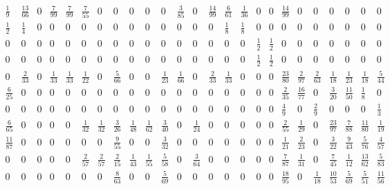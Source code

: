 \documentclass[11pt]{report}
\begin{document}
\begin{appendices}
\begin{figure} [H]
\begin{equation*}
\begin{array}{ccccccccccccccccccccccccc}
\frac{1}{9}&\frac{13}{66}&0&\frac{7}{99}&\frac{7}{99}&\frac{7}{55}&0&0&0&0&0&\frac{3}{85}&0&\frac{14}{99}&\frac{6}{61}&\frac{1}{36}&0&0&\frac{14}{99}&0&0&0&0&0&0\\

\frac{1}{2}&\frac{1}{4}&0&0&0&0&0&0&0&0&0&0&0&0&\frac{1}{8}&\frac{1}{8}&0&0&0&0&0&0&0&0&0\\

0&0&0&0&0&0&0&0&0&0&0&0&0&0&0&0&\frac{1}{2}&\frac{1}{2}&0&0&0&0&0&0&0\\

0&0&0&0&0&0&0&0&0&0&0&0&0&0&0&0&\frac{1}{2}&\frac{1}{2}&0&0&0&0&0&0&0\\

0&\frac{2}{33}&0&\frac{1}{33}&\frac{1}{33}&\frac{1}{22}&0&\frac{5}{66}&0&0&\frac{1}{23}&\frac{1}{66}&0&\frac{2}{33}&\frac{1}{33}&0&0&0&\frac{23}{80}&\frac{2}{97}&\frac{2}{63}&\frac{1}{18}&\frac{1}{23}&\frac{1}{18}&\frac{5}{44}\\

\frac{6}{25}&0&0&0&0&0&0&0&0&0&0&0&0&0&0&0&0&0&\frac{2}{35}&\frac{16}{77}&0&\frac{3}{20}&\frac{11}{50}&\frac{1}{8}&0\\

0&0&0&0&0&0&0&0&0&0&0&0&0&0&0&0&0&0&\frac{4}{9}&0&\frac{2}{9}&0&0&0&\frac{1}{3}\\

\frac{6}{65}&0&0&0&0&\frac{1}{32}&\frac{1}{32}&\frac{3}{26}&\frac{1}{48}&\frac{1}{62}&\frac{3}{40}&0&\frac{1}{24}&0&0&0&0&0&\frac{2}{55}&\frac{1}{29}&0&\frac{23}{97}&\frac{7}{88}&\frac{11}{80}&\frac{1}{19}\\

\frac{11}{87}&0&0&0&0&0&0&\frac{9}{55}&0&0&\frac{3}{32}&0&0&0&0&0&0&0&\frac{1}{21}&\frac{2}{23}&0&\frac{3}{22}&\frac{9}{43}&\frac{5}{76}&\frac{4}{57}\\

0&0&0&0&0&\frac{2}{57}&\frac{2}{57}&\frac{2}{15}&\frac{1}{43}&\frac{1}{55}&\frac{5}{58}&0&\frac{3}{64}&0&0&0&0&0&\frac{7}{87}&\frac{1}{31}&0&\frac{7}{45}&\frac{1}{12}&\frac{13}{62}&\frac{5}{83}\\

0&0&0&0&0&0&0&\frac{8}{63}&0&0&\frac{5}{69}&0&0&0&0&0&0&0&\frac{18}{95}&0&\frac{1}{18}&\frac{10}{53}&\frac{5}{69}&\frac{5}{51}&\frac{11}{56}\\


\end{array}
\end{equation*}
\end{figure}
\end{appendices}
\end{document}
